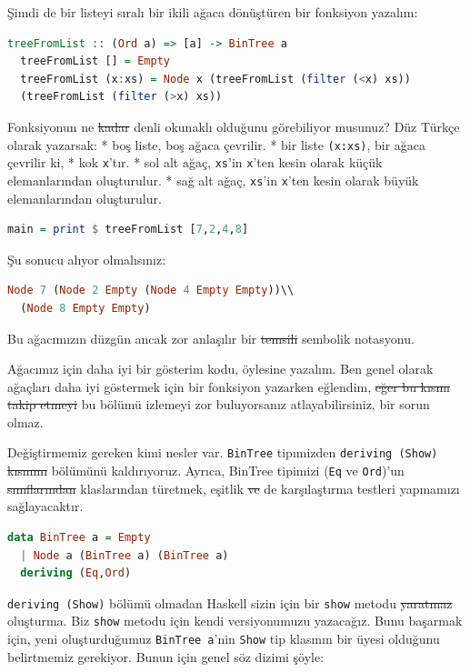 \documentclass[a4paper,14pt,openany]{extbook} %
\begin{document}
Şimdi de bir listeyi sıralı bir ikili ağaca dönüştüren bir fonksiyon
yazalım:

\begin{lstlisting}[language=Haskell]
  treeFromList :: (Ord a) => [a] -> BinTree a
  treeFromList [] = Empty
  treeFromList (x:xs) = Node x (treeFromList (filter (<x) xs))
  (treeFromList (filter (>x) xs))
\end{lstlisting}

Fonksiyonun ne \st{kadar} denli okunaklı olduğunu görebiliyor musunuz?
Düz Türkçe olarak yazarsak: * boş liste, boş ağaca çevrilir. * bir liste
\lstinline!(x:xs)!, bir ağaca çevrilir ki, * kok \lstinline!x!'tır. *
sol alt ağaç, \lstinline!xs!'in \lstinline!x!'ten kesin olarak küçük
elemanlarından oluşturulur. * sağ alt ağaç, \lstinline!xs!'in
\lstinline!x!'ten kesin olarak büyük elemanlarından oluşturulur.

\begin{lstlisting}[language=Haskell]
  main = print $ treeFromList [7,2,4,8]
\end{lstlisting}

Şu sonucu alıyor olmalısınız:

\begin{lstlisting}[language=Haskell]
  Node 7 (Node 2 Empty (Node 4 Empty Empty))\\
  (Node 8 Empty Empty)
\end{lstlisting}

Bu ağacımızın düzgün ancak zor anlaşılır bir \st{temsili} sembolik notasyonu.

Ağacımız için daha iyi bir gösterim kodu, öylesine yazalım. Ben genel
olarak ağaçları daha iyi göstermek için bir fonksiyon yazarken eğlendim,
\st{eğer bu kısmı takip etmeyi} bu bölümü izlemeyi zor buluyorsanız atlayabilirsiniz, bir sorun olmaz.

Değiştirmemiz gereken kimi nesler var. \lstinline!BinTree! tipımizden
\lstinline!deriving (Show)! \st{kısmını}  bölümünü kaldırıyoruz. Ayrıca, BinTree
tipimizi (\lstinline!Eq! ve \lstinline!Ord!)'un \st{sınıflarından} klaslarından türetmek,
eşitlik \st{ve} de karşılaştırma testleri yapmamızı sağlayacaktır.

\begin{lstlisting}[language=Haskell]
  data BinTree a = Empty
  | Node a (BinTree a) (BinTree a)
  deriving (Eq,Ord)
\end{lstlisting}

\lstinline!deriving (Show)! bölümü olmadan Haskell sizin için bir
\lstinline!show! metodu \st{yaratmaz} oluşturma. Biz \lstinline!show! metodu için kendi
versiyonumuzu yazacağız. Bunu başarmak için, yeni oluşturduğumuz
\lstinline!BinTree a!'nin \lstinline!Show! tip klasının bir üyesi
olduğunu belirtmemiz gerekiyor. Bunun için genel söz dizimi şöyle:
\end{document}
